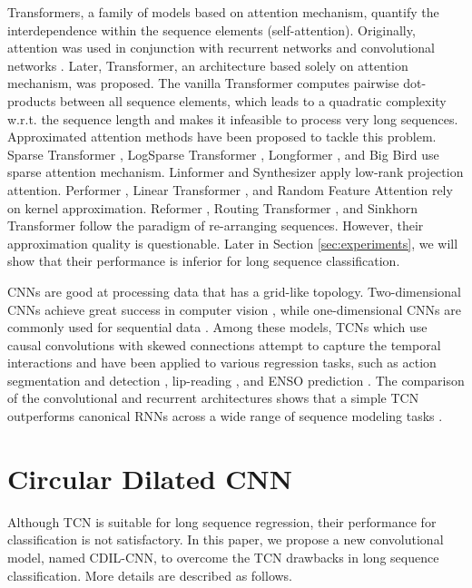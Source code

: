 \documentclass{article}
\begin{document}
Transformers, a family of models based on attention mechanism, quantify the interdependence within the sequence elements (self-attention). Originally, attention was used in conjunction with recurrent networks and convolutional networks \cite{mnih2014recurrent, kim2017structured}. Later, Transformer, an architecture based solely on attention mechanism, was proposed. The vanilla Transformer computes pairwise dot-products between all sequence elements, which leads to a quadratic complexity w.r.t. the sequence length and makes it infeasible to process very long sequences. Approximated attention methods have been proposed to tackle this problem. Sparse Transformer \cite{child2019generating}, LogSparse Transformer \cite{li2019enhancing}, Longformer \cite{beltagy2020longformer}, and Big Bird \cite{zaheer2020big} use sparse attention mechanism. Linformer \cite{wang2020linformer} and Synthesizer \cite{tay2021synthesizer} apply low-rank projection attention. Performer \cite{choromanski2020rethinking}, Linear Transformer \cite{katharopoulos2020transformers}, and Random Feature Attention \cite{peng2021random} rely on kernel approximation. Reformer \cite{kitaev2020reformer}, Routing Transformer \cite{roy2021efficient}, and Sinkhorn Transformer \cite{tay2020sparse} follow the paradigm of re-arranging sequences. However, their approximation quality is questionable. Later in Section \ref{sec:experiments}, we will show that their performance is inferior for long sequence classification.  

CNNs are good at processing data that has a grid-like topology. Two-dimensional CNNs achieve great success in computer vision \cite{lecun1998gradient, krizhevsky2012imagenet, simonyan2014very, Szegedy_2015_CVPR}, while one-dimensional CNNs are commonly used for sequential data \cite{oord2016wavenet, kalchbrenner2016neural, gehring2016convolutional}. Among these models, TCNs which use causal convolutions with skewed connections attempt to capture the temporal interactions and have been applied to various regression tasks, such as action segmentation and detection \cite{lea2016temporal, lea2017temporal}, lip-reading \cite{martinez2020lipreading, ma2021lip}, and ENSO prediction \cite{yan2020temporal}. The comparison of the convolutional and recurrent architectures shows that a simple TCN outperforms canonical RNNs across a wide range of sequence modeling tasks \cite{bai2018empirical}.


\section{Circular Dilated CNN}
\label{sec:cdil}
Although TCN is suitable for long sequence regression, their performance for classification is not satisfactory. In this paper, we propose a new convolutional model, named CDIL-CNN, to overcome the TCN drawbacks in long sequence classification. More details are described as follows.
\end{document}
